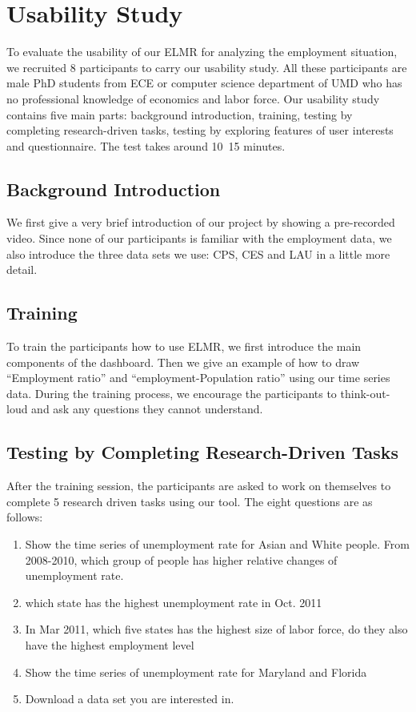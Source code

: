 \documentclass{sigchi}
\begin{document}
\section{Usability Study}

To evaluate the usability of our ELMR for analyzing the employment situation, we recruited 8 participants to carry our usability study. All these participants are male PhD students from ECE or computer science department of UMD who has no professional knowledge of economics and labor force. Our usability study contains five main parts: background introduction, training, testing by completing research-driven tasks, testing by exploring features of user interests and questionnaire. The test takes around 10~15 minutes.

\subsection{Background Introduction}
We first give a very brief introduction of our project by showing a pre-recorded video. Since none of our participants is familiar with the employment data, we also introduce the three data sets we use: CPS, CES and LAU in a little more detail.


\subsection{Training}
To train the participants how to use ELMR, we first introduce the main components of the dashboard. Then we give an example of how to draw ``Employment ratio'' and ``employment-Population ratio'' using our time series data. During the training process, we encourage the participants to think-out-loud and ask any questions they cannot understand.

\subsection{Testing by Completing Research-Driven Tasks}
After the training session, the participants are asked to work on themselves to complete 5 research driven tasks using our tool. The eight questions are as follows:
\begin{enumerate}
\item    Show the time series of unemployment rate for Asian and White people. From 2008-2010, which group of people has higher relative changes of unemployment rate.

\item    which state has the highest unemployment rate in Oct. 2011
\item    In Mar 2011, which five states has the highest size of labor force, do they also have the highest employment level
\item     Show the time series of unemployment rate for Maryland and Florida
\item     Download a data set you are interested in.
\end{enumerate}
\end{document}
